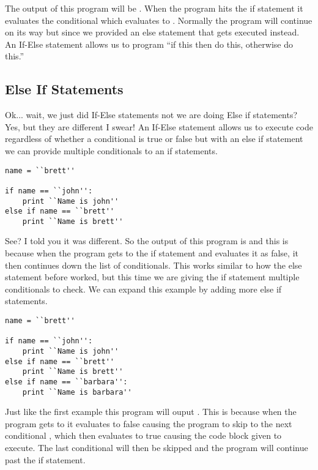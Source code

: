 The output of this program will be .
When the program hits the if statement it evaluates the conditional  which evaluates to .
Normally the program will continue on its way but since we provided an else statement that gets executed instead.
An If-Else statement allows us to program ``if this then do this, otherwise do this.''

\subsection{Else If Statements}
Ok... wait, we just did If-Else statements not we are doing Else if statements?
Yes, but they are different I swear!
An If-Else statement allows us to execute code regardless of whether a conditional is true or false but with an else if statement we can provide multiple conditionals to an if statements.

\begin{lstlisting}[caption={Else If Statement}]
name = ``brett''

if name == ``john'':
    print ``Name is john''
else if name == ``brett''
    print ``Name is brett''
\end{lstlisting}

See? I told you it was different.
So the output of this program is  and this is because when the program gets to the if statement and evaluates it as false, it then continues down the list of conditionals.
This works similar to how the else statement before worked, but this time we are giving the if statement multiple conditionals to check.
We can expand this example by adding more else if statements.

\begin{lstlisting}[caption={Else If Statement 2}]
name = ``brett''

if name == ``john'':
    print ``Name is john''
else if name == ``brett''
    print ``Name is brett''
else if name == ``barbara'':
    print ``Name is barbara''
\end{lstlisting}

Just like the first example this program will ouput .
This is because when the program gets to  it evaluates to false causing the program to skip to the next conditional , which then evaluates to true causing the code block given to execute.
The last conditional  will then be skipped and the program will continue past the if statement.
\par

